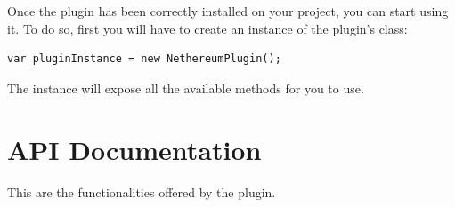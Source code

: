 \documentclass[a4paper, 11pt, titlepage]{article}
\begin{document}
Once the plugin has been correctly installed on your project, you can start using it. To do so, first you will have to create an instance of the plugin's class:

\begin{verbatim}
var pluginInstance = new NethereumPlugin();
\end{verbatim}

\noindent
The instance will expose all the available methods for you to use.

\section{API Documentation}
\label{sec:org92a5a0b}

This are the functionalities offered by the plugin.
\end{document}
